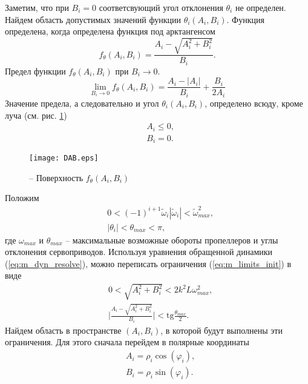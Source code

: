 Заметим, что при $B_i = 0$ соответсвующий угол отклонения $\theta_i$ не определен. Найдем область допустимых значений функции $\theta_i(A_i, B_i)$.
Функция определена, когда определена функция под арктангенсом
\begin{equation}
f_{\theta}(A_i, B_i) = \frac{A_i-\sqrt{A^2_i +  B^2_i}}{B_i}.
\end{equation}
Предел функции $f_{\theta}(A_i, B_i)$ при $B_i \to 0$.
\begin{equation}
\lim_{B_i \to 0} f_{\theta}(A_i, B_i) =
\frac{{A_i} - |A_i|}{B_i} + 
\frac{B_i}{2A_i}
\end{equation}
Значение предела, а следовательно и угол $\theta_i(A_i, B_i)$, определено всюду, кроме луча (см. рис. \ref{fig:f_th})
\begin{equation} \label{m_theta_exists}
\begin{aligned}
&A_i \leq 0, \\
&B_i = 0.
\end{aligned}
\end{equation}
\begin{figure}[h!]
	\centering
	\texttt{[image: DAB.eps]}
	\caption{ -- Поверхность $f_{\theta}(A_i, B_i)$}
	\label{fig:f_th}
\end{figure}
Положим 
\begin{equation} \label{eq:m_limits_init}
\begin{aligned}
&0< (-1)^{i+1} \tilde \omega_i |\tilde\omega_i| < \tilde \omega_{max}^2,
\\
&|\theta_i| < \theta_{max} < \pi,
\end{aligned}
\end{equation}
где $\omega_{max}$ и $\theta_{max}$ -- максимальные возможные обороты пропеллеров и углы отклонения сервоприводов.
Используя уравнения обращенной динамики (\ref{eq:m_dyn_resolve}), можно переписать ограничения (\ref{eq:m_limits_init}) в виде
\begin{equation} \label{eq:m_limits_AB}
\begin{aligned}
&0 <
\sqrt{A^2_i +  B^2_i}
< 2 k^2 L\omega_{max}^2,
\\
&\Bigg|\frac{A_i-\sqrt{A^2_i +  B^2_i}}{B_i}\Bigg| < 
\text{tg}\frac{\theta_{max}}{2}.
\end{aligned}
\end{equation}
Найдем область в пространстве $(A_i, B_i)$, в которой будут выполнены эти ограничения. Для этого сначала перейдем в полярные координаты
\begin{equation} \label{eq:m_polar}
\begin{aligned}
&A_i = \rho_i \cos(\varphi_i),
\\
&B_i = \rho_i \sin(\varphi_i).
\end{aligned}
\end{equation}
